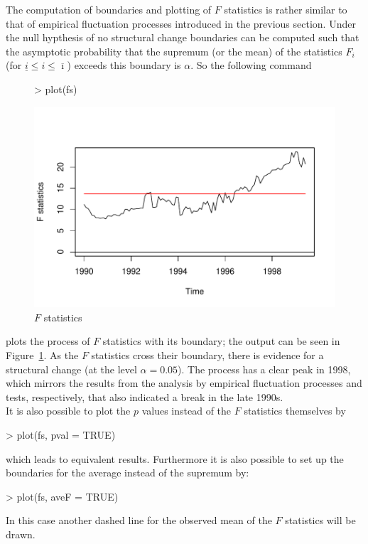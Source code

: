 \documentclass[10pt,a4paper]{article}
\newcommand{\ui}{\underline{i}}
\newcommand{\oi}{\overline{\imath}}
\begin{document}
The computation of boundaries and plotting of $F$ statistics is rather similar
to that of empirical fluctuation processes introduced in the previous section.
Under the null hypthesis of no structural change boundaries can be computed
such that the asymptotic probability that the supremum (or the mean) of the
statistics $F_i$ (for $\ui \le i \le \oi$) exceeds this boundary is $\alpha$.
So the following command
\begin{figure}[htbp]
\begin{center}
\begin{Schunk}
\begin{Sinput}
> plot(fs)
\end{Sinput}
\end{Schunk}
\includegraphics{strucchange-intro-Fstats-plot}
\caption{\label{fig:Fstats} $F$ statistics}
\end{center}
\end{figure}
plots the process of $F$ statistics with its boundary;
the output can be seen in
Figure~\ref{fig:Fstats}. As the $F$ statistics cross their boundary, there is
evidence for a structural change (at the level $\alpha = 0.05$). The process
has a clear peak in 1998, which mirrors
the results from the analysis by empirical fluctuation processes and tests,
respectively, that also indicated a break in the late 1990s.\\

It is also possible to plot the $p$ values instead of
the $F$ statistics themselves by
\begin{Schunk}
\begin{Sinput}
> plot(fs, pval = TRUE)
\end{Sinput}
\end{Schunk}
which leads to equivalent results. Furthermore it is also possible to set up
the boundaries for the average instead of the supremum by:
\begin{Schunk}
\begin{Sinput}
> plot(fs, aveF = TRUE)
\end{Sinput}
\end{Schunk}
In this case another dashed line for the observed mean of the $F$ statistics
will be drawn.
\end{document}
